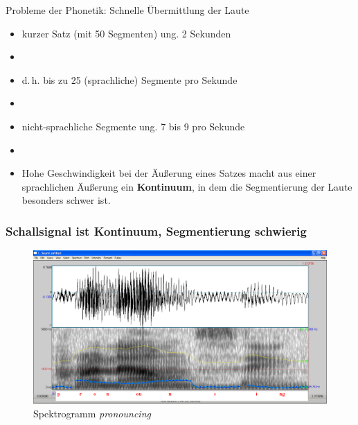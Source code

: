 
\begin{frame}{Probleme der Phonetik: Schnelle Übermittlung der Laute}

		\begin{itemize}
			\item kurzer Satz (mit 50 Segmenten) \ras ung. 2 Sekunden
			\item[]
			\item d.\,h. bis zu 25 (sprachliche) Segmente pro Sekunde
			\item[]
			\item nicht-sprachliche Segmente \ras ung. 7 bis 9 pro Sekunde
			\item[]
			\item[\ra] Hohe Geschwindigkeit bei der Äußerung eines Satzes macht aus einer sprachlichen Äußerung ein \textbf{Kontinuum}, in dem die Segmentierung der Laute besonders schwer ist.
		\end{itemize}
		
	
\end{frame}



\begin{frame}
\frametitle{Schallsignal ist Kontinuum, Segmentierung schwierig}

	\begin{figure}[H]
	\centering
	
	\includegraphics[scale=0.2]{material/04Pronouncing}
	\caption{Spektrogramm \emph{pronouncing}}
	\end{figure}	
	
\end{frame}


